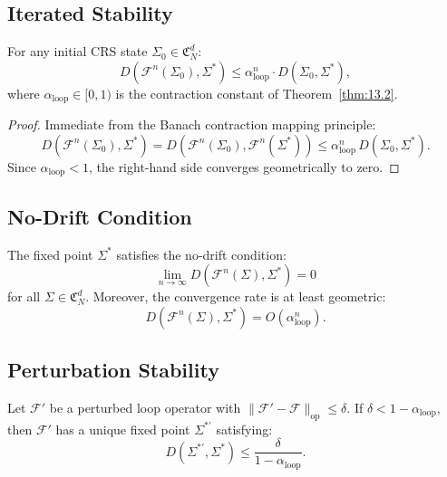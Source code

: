 \subsection{Iterated Stability}

\begin{theorem}\label{thm:13.9}
For any initial CRS state $\Sigma_0 \in \mathfrak{C}_N^d$:
\begin{equation}\label{eq:geom-conv}
  D(\mathcal{F}^n(\Sigma_0), \Sigma^*)
  \leq \alpha_{\mathrm{loop}}^n \cdot D(\Sigma_0, \Sigma^*),
\end{equation}
where $\alpha_{\mathrm{loop}} \in [0,1)$ is the contraction constant
of Theorem~\ref{thm:13.2}.
\end{theorem}

\begin{proof}
Immediate from the Banach contraction mapping principle:
\[
  D(\mathcal{F}^n(\Sigma_0), \Sigma^*)
  = D(\mathcal{F}^n(\Sigma_0), \mathcal{F}^n(\Sigma^*))
  \leq \alpha_{\mathrm{loop}}^n \, D(\Sigma_0, \Sigma^*).
\]
Since $\alpha_{\mathrm{loop}} < 1$, the right-hand side converges
geometrically to zero.
\end{proof}

\subsection{No-Drift Condition}

\begin{corollary}\label{cor:13.3}
The fixed point $\Sigma^*$ satisfies the no-drift condition:
\begin{equation}\label{eq:no-drift}
  \lim_{n \to \infty} D(\mathcal{F}^n(\Sigma), \Sigma^*) = 0
\end{equation}
for all $\Sigma \in \mathfrak{C}_N^d$.  Moreover, the convergence
rate is at least geometric:
\[
  D(\mathcal{F}^n(\Sigma), \Sigma^*)
  = O(\alpha_{\mathrm{loop}}^n).
\]
\end{corollary}

\subsection{Perturbation Stability}

\begin{theorem}\label{thm:13.10}
Let $\mathcal{F}'$ be a perturbed loop operator with
$\|\mathcal{F}' - \mathcal{F}\|_{\mathrm{op}} \leq \delta$.
If $\delta < 1 - \alpha_{\mathrm{loop}}$, then $\mathcal{F}'$ has
a unique fixed point $\Sigma^{*\prime}$ satisfying:
\begin{equation}\label{eq:perturb-bound}
  D(\Sigma^{*\prime}, \Sigma^*)
  \leq \frac{\delta}{1 - \alpha_{\mathrm{loop}}}.
\end{equation}
\end{theorem}

